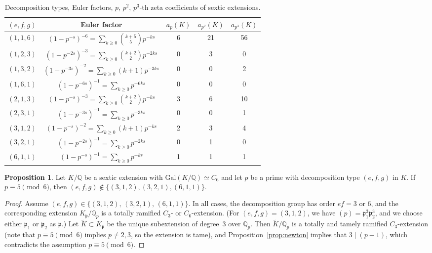 \documentclass[letterpaper, 10pt]{article}
\newcommand{\Gal}{\mathrm{Gal}}
\newcommand{\bQ}{\mathbb{Q}}
\newcommand{\1}{\mathds{1}}	%
\theoremstyle{definition}
\newtheorem{proposition}[theorem]{Proposition}
\theoremstyle{remark}
\begin{document}
\begin{table}[h]
    \begin{center}
        \begin{tabular}{c|c|c|c|c}
            \toprule
            $(e, f, g)$ & Euler factor & $a_p(K)$ & $a_{p^2}(K)$ & $a_{p^3}(K)$\\
            \midrule
            $(1, 1, 6)$ & $(1 - p^{-s})^{-6} = \sum_{k \ge 0}\binom{k+5}{5} p^{-ks}$ & 6 & 21 & 56 \\
            $(1, 2, 3)$ & $(1 - p^{-2s})^{-3} = \sum_{k \ge 0} \binom{k + 2}{2}p^{-2ks}$ & 0 & 3 & 0\\
            $(1, 3, 2)$ & $(1 - p^{-3s})^{-2} = \sum_{k \ge 0} (k + 1)p^{-3ks}$ & 0 & 0 & 2 \\
            $(1, 6, 1)$ & $(1 - p^{-6s})^{-1} = \sum_{k \ge 0} p^{-6ks}$ & 0 & 0 & 0 \\
            $(2, 1, 3)$ & $(1 - p^{-s})^{-3} = \sum_{k \ge 0} \binom{k+2}{2}p^{-ks}$ & 3 & 6 & 10 \\
            $(2, 3, 1)$ & $(1 - p^{-3s})^{-1} = \sum_{k \ge 0}p^{-3ks}$ & 0 & 0 & 1\\
            $(3, 1, 2)$ & $(1 - p^{-s})^{-2} = \sum_{k \ge 0} (k + 1) p^{-ks}$ & 2 & 3 & 4\\
            $(3, 2, 1)$ & $(1 - p^{-2s})^{-1} = \sum_{k \ge 0} p^{-2ks}$ & 0 & 1 & 0\\
            $(6, 1, 1)$ & $(1 - p^{-s})^{-1} = \sum_{k \ge 0} p^{-ks}$ & 1 & 1 & 1 \\
            \bottomrule
        \end{tabular}
        \caption{Decomposition types, Euler factors, $p$, $p^2$, $p^3$-th zeta coefficients of sextic extensions.}
        \label{tab:sexticeuler}
    \end{center}
\end{table}


\begin{proposition}
    \label{prop:C6ram}
    Let $K / \bQ$ be a sextic extension with $\Gal(K / \bQ) \simeq C_6$ and let $p$ be a prime with decomposition type $(e, f, g)$ in $K$.
    If $p \equiv 5 \pmod{6}$, then $(e, f, g) \not \in \{(3, 1, 2), (3, 2, 1), (6, 1, 1)\}$.
\end{proposition}
\begin{proof}
   
Assume \( (e, f, g) \in \{(3, 1, 2),\, (3, 2, 1),\, (6, 1, 1)\} \).   In all cases, the decomposition group has order \( ef = 3 \) or \( 6 \), and the corresponding extension \( K_\mathfrak{p} / \mathbb{Q}_p \) is a totally ramified \( C_3 \)- or \( C_6 \)-extension.   (For \( (e, f, g) = (3, 1, 2) \), we have \( (p) = \mathfrak{p}_1^3 \mathfrak{p}_2^3 \), and we choose either \( \mathfrak{p}_1 \) or \( \mathfrak{p}_2 \) as \( \mathfrak{p} \).) Let \( \tilde{K} \subset K_\mathfrak{p} \) be the unique subextension of degree~3 over \( \mathbb{Q}_p \).   Then \( \tilde{K} / \mathbb{Q}_p \) is a totally and tamely ramified \( C_3 \)-extension (note that $p\equiv 5 \pmod{6}$ implies $p \ne 2, 3$, so the extension is tame), and Proposition~\ref{prop:newton} implies that \( 3 \mid (p - 1) \), which contradicts the assumption \(  p \equiv 5 \pmod{6} \).
\end{proof}
\end{document}
